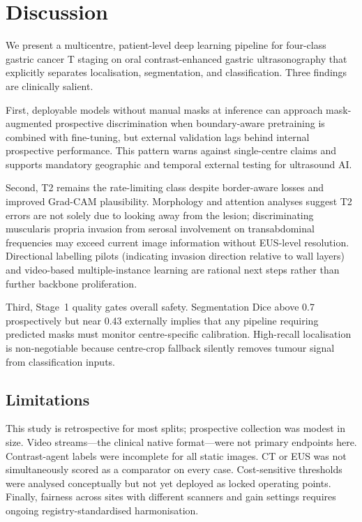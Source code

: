 \documentclass[11pt,a4paper]{article}
\begin{document}
\section{Discussion}
We present a multicentre, patient-level deep learning pipeline for four-class gastric cancer T staging on oral contrast-enhanced gastric ultrasonography that explicitly separates localisation, segmentation, and classification. Three findings are clinically salient.

First, deployable models without manual masks at inference can approach mask-augmented prospective discrimination when boundary-aware pretraining is combined with fine-tuning, but external validation lags behind internal prospective performance. This pattern warns against single-centre claims and supports mandatory geographic and temporal external testing for ultrasound AI.

Second, T2 remains the rate-limiting class despite border-aware losses and improved Grad-CAM plausibility. Morphology and attention analyses suggest T2 errors are not solely due to looking away from the lesion; discriminating muscularis propria invasion from serosal involvement on transabdominal frequencies may exceed current image information without EUS-level resolution. Directional labelling pilots (indicating invasion direction relative to wall layers) and video-based multiple-instance learning are rational next steps rather than further backbone proliferation.

Third, Stage~1 quality gates overall safety. Segmentation Dice above 0.7 prospectively but near 0.43 externally implies that any pipeline requiring predicted masks must monitor centre-specific calibration. High-recall localisation is non-negotiable because centre-crop fallback silently removes tumour signal from classification inputs.

\subsection{Limitations}
This study is retrospective for most splits; prospective collection was modest in size. Video streams---the clinical native format---were not primary endpoints here. Contrast-agent labels were incomplete for all static images. CT or EUS was not simultaneously scored as a comparator on every case. Cost-sensitive thresholds were analysed conceptually but not yet deployed as locked operating points. Finally, fairness across sites with different scanners and gain settings requires ongoing registry-standardised harmonisation.
\end{document}
